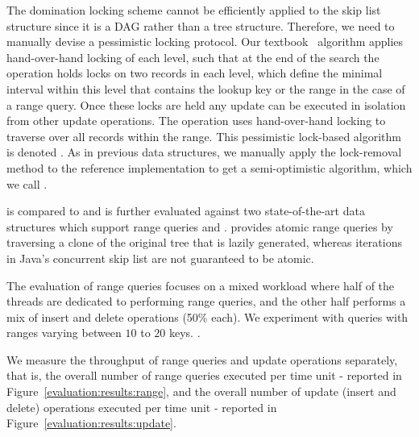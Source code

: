 The domination locking scheme cannot be efficiently applied to the skip list
structure since it is a DAG rather than a tree structure. Therefore, we need to
manually devise a pessimistic locking protocol. Our
textbook~\cite{HerlihyS2008} algorithm applies hand-over-hand locking of each
level, such that at the end of the search the operation holds locks on two
records in each level, which define the minimal interval within this level that
contains the lookup key or the range in the case of a range query. 
Once these locks are held any update can be executed in isolation from other
update operations. The operation uses hand-over-hand locking to traverse over
all records within the range. This pessimistic lock-based algorithm
is denoted \domSkiplist. As in previous data structures, we manually apply the
lock-removal method to the reference implementation to get a semi-optimistic algorithm, which we call \autoSkiplist.

\autoSkiplist is compared to \domSkiplist and is further evaluated against two
state-of-the-art data structures which support range queries \bronson and \skiplist.
\bronson provides atomic range queries by traversing a clone of the
original tree that is lazily generated,
whereas iterations in Java's concurrent skip list are not
guaranteed to be atomic.

The evaluation of range queries focuses on a mixed workload where half of the
threads are dedicated to performing range queries, and the other half performs a
mix of insert and delete operations (50\% each). 
We experiment with queries with ranges varying between $10$ to $20$
keys.
.

We measure the throughput of range queries and update operations separately,
that is, the overall number of range queries executed per time unit - reported
in Figure~\ref{evaluation:results:range}, and the overall number of update (insert and
delete) operations executed per time unit - reported in
Figure~\ref{evaluation:results:update}.

% 

